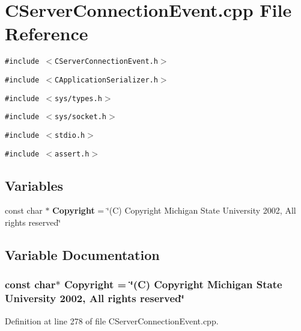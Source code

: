 \section{CServer\-Connection\-Event.cpp File Reference}
\label{CServerConnectionEvent_8cpp}
{\tt \#include $<$CServer\-Connection\-Event.h$>$}\par
{\tt \#include $<$CApplication\-Serializer.h$>$}\par
{\tt \#include $<$sys/types.h$>$}\par
{\tt \#include $<$sys/socket.h$>$}\par
{\tt \#include $<$stdio.h$>$}\par
{\tt \#include $<$assert.h$>$}\par
\subsection*{Variables}
\begin{CompactItemize}
\item 
const char $\ast$ {\bf Copyright} = \char`\"{}(C) Copyright Michigan State University 2002, All rights reserved\char`\"{}
\end{CompactItemize}


\subsection{Variable Documentation}
\subsubsection{\setlength{\rightskip}{0pt plus 5cm}const char$\ast$ Copyright = \char`\"{}(C) Copyright Michigan State University 2002, All rights reserved\char`\"{}\hspace{0.3cm}{\tt  [static]}}\label{CServerConnectionEvent_8cpp_a0}




Definition at line 278 of file CServer\-Connection\-Event.cpp.